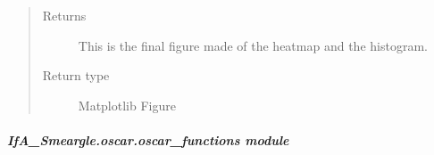 \documentclass[letterpaper,10pt,english]{sphinxmanual}
\begin{document}
\begin{fulllineitems}
\begin{quote}
\begin{description}
\begin{itemize}
\end{itemize}

\item[{Returns}] \leavevmode
{} \textendash{} This is the final figure made of the heatmap and the histogram.

\item[{Return type}] \leavevmode
Matplotlib Figure

\end{description}\end{quote}

\end{fulllineitems}



\subparagraph{IfA\_Smeargle.oscar.oscar\_functions module}
\label{\detokenize{python_docstrings/IfA_Smeargle.oscar.oscar_functions:module-IfA_Smeargle.oscar.oscar_functions}}\label{\detokenize{python_docstrings/IfA_Smeargle.oscar.oscar_functions:ifa-smeargle-oscar-oscar-functions-module}}\label{\detokenize{python_docstrings/IfA_Smeargle.oscar.oscar_functions::doc}}
\end{document}
